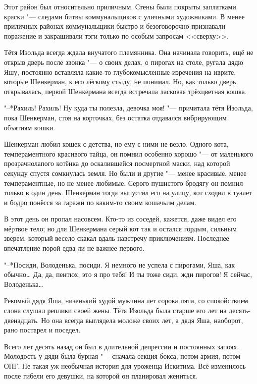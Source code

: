 \asterism

\textspace

\label{Fri_2012_07_20}

Этот район был относительно приличным.
Стены были покрыты заплатками краски "--- следами битвы коммунальщиков с уличными художниками.
В менее приличных районах коммунальщики быстро и безоговорочно признавали поражение и закрашивали тэги только по особым запросам <<сверху>>.

Тётя Изольда всегда ждала внучатого племянника.
Она начинала говорить, ещё не открыв дверь после звонка "--- о своих делах, о пирогах на столе, ругала дядю Яшу, постоянно вставляла какие-то глубокомысленные изречения на иврите, которые Шенкерман, к его лёгкому стыду, не понимал.
Но, как только дверь открывалась, первой Шенкермана всегда встречала ласковая трёхцветная кошка.

"--*Рахиль!
Рахиль!
Ну куда ты полезла, девочка моя! "--- причитала тётя Изольда, пока Шенкерман, стоя на корточках, без остатка отдавался вибрирующим объятиям кошки.

Шенкерман любил кошек с детства, но ему с ними не везло.
Одного кота, темпераментного красивого тайца, он помнил особенно хорошо "--- от маленького прозрачнолапого котёнка до оскалившейся посмертной маски, над которой секунду спустя сомкнулась земля.
Но были и другие "--- менее красивые, менее темпераментные, но не менее любимые.
Серого пушистого бродягу он помнил только в один день.
Шенкерман тогда выпустил его на улицу, кот сходил в туалет и бодро понёсся за гаражи по каким-то своим кошачьим делам.

В этот день он пропал насовсем.
Кто-то из соседей, кажется, даже видел его мёртвое тело;
но для Шенкермана серый кот так и остался гордым, сильным зверем, который весело скакал вдаль навстречу приключениям.
Последнее впечатление порой едва ли не важнее первого.

\asterism

"--*Посиди, Володенька, посиди.
Я немного не успела с пирогами, Яша, как обычно\ldots{}
Да, да, пентюх, это я про тебя!
И ты тоже сиди, жди пирогов!
Я сейчас, Володенька\ldots{}

Рекомый дядя Яша, низенький худой мужчина лет сорока пяти, со спокойствием слона слушал реплики своей жены.
Тётя Изольда была старше его лет на десять-двенадцать.
Но она всегда выглядела моложе своих лет, а дядя Яша, наоборот, рано постарел и поседел.

Всего лет десять назад он был в длительной депрессии и постоянных запоях.
Молодость у дяди была бурная "--- сначала секция бокса, потом армия, потом ОПГ.
Не такая уж необычная история для уроженца Искитима.
Всё изменилось после гибели его девушки, на которой он планировал жениться.

